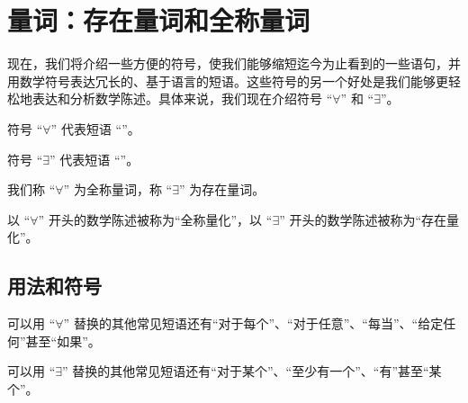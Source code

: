\section{量词：存在量词和全称量词}

现在，我们将介绍一些方便的符号，使我们能够缩短迄今为止看到的一些语句，并用数学符号表达冗长的、基于语言的短语。这些符号的另一个好处是我们能够更轻松地表达和分析数学陈述。具体来说，我们现在介绍符号 ``$\forall$'' 和 ``$\exists$''。

\begin{definition}
    符号 ``$\forall$'' 代表短语 ``''。

    符号 ``$\exists$'' 代表短语 ``''。

    我们称 ``$\forall$'' 为全称量词，称 ``$\exists$'' 为存在量词。

    以 ``$\forall$'' 开头的数学陈述被称为``全称量化''，以 ``$\exists$'' 开头的数学陈述被称为``存在量化''。
\end{definition}

\subsection{用法和符号}

可以用 ``$\forall$'' 替换的其他常见短语还有``对于每个''、``对于任意''、``每当''、``给定任何''甚至``如果''。

可以用 ``$\exists$'' 替换的其他常见短语还有``对于某个''、``至少有一个''、``有''甚至``某个''。\\

